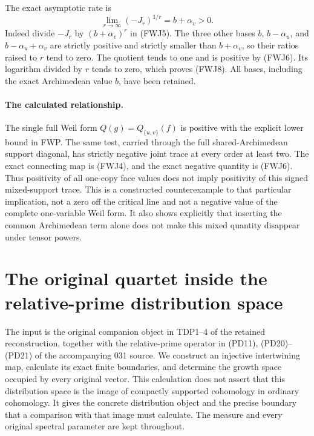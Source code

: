 \documentclass[11pt]{article}
\begin{document}
The exact asymptotic rate is
\begin{equation}\tag{FWJ8}
 \lim_{r\to\infty}(-J_r)^{1/r}=b+\alpha_v>0.
\end{equation}
Indeed divide $-J_r$ by $(b+\alpha_v)^r$ in (FWJ5). The three
other bases $b$, $b-\alpha_u$, and $b-\alpha_u+\alpha_v$ are
strictly positive and strictly smaller than $b+\alpha_v$, so their
ratios raised to $r$ tend to zero. The quotient tends to one and
is positive by (FWJ6). Its logarithm divided by $r$ tends to zero,
which proves (FWJ8). All bases, including the exact Archimedean
value $b$, have been retained.

\paragraph{The calculated relationship.}
The single full Weil form $Q(g)=Q_{\{u,v\}}(f)$ is positive with
the explicit lower bound in FWP. The same test, carried through the
full shared-Archimedean support diagonal, has strictly negative
joint trace at every order at least two. The exact connecting map
is (FWJ4), and the exact negative quantity is (FWJ6). Thus positivity
of all one-copy face values does not imply positivity of this signed
mixed-support trace. This is a constructed counterexample to that
particular implication, not a zero off the critical line and not a
negative value of the complete one-variable Weil form. It also
shows explicitly that inserting the common Archimedean term alone
does not make this mixed quantity disappear under tensor powers.


\section{The original quartet inside the relative-prime distribution space}
\label{sec:spectral-boundary-transport}

The input is the original companion object in TDP1--4 of the retained
reconstruction, together with the relative-prime operator in (PD11),
(PD20)--(PD21) of the accompanying 031 source. We construct an injective
intertwining map, calculate its exact finite boundaries, and determine
the growth space occupied by every original vector. This calculation
does not assert that this distribution space is the image of compactly
supported cohomology in ordinary cohomology. It gives the concrete
distribution object and the precise boundary that a comparison with
that image must calculate. The measure and every original spectral
parameter are kept throughout.
\end{document}
